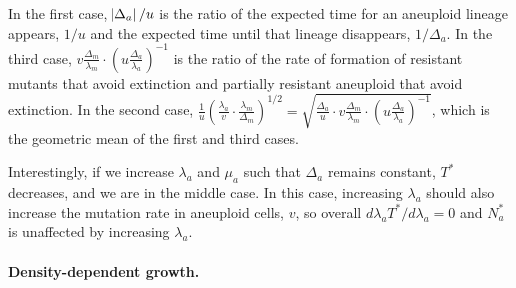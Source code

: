 \documentclass[12pt]{extarticle}
\newcommand{\presc}{p_\text{rescue}}
\begin{document}
In the first case, $\abs{\Delta_a}/u$ is  the ratio of the expected time for an aneuploid lineage appears, $1/u$ and the expected time until that lineage disappears, $1/\Delta_a$.
In the third case, $v \frac{\Delta_m}{\lambda_m} \cdot \left(u \frac{\Delta_a}{\lambda_a}\right)^{-1}$ is the ratio of the rate of formation of resistant mutants that avoid extinction and partially resistant aneuploid that avoid extinction.
In the second case, $\frac{1}{u}\left(\frac{\lambda_a}{v} \cdot \frac{\lambda_m}{\Delta_m}\right)^{1/2}=\sqrt{\frac{\Delta_a}{u} \cdot v \frac{\Delta_m}{\lambda_m} \cdot \left(u\frac{\Delta_a}{\lambda_a}\right)^{-1}}$, which is the geometric mean of the first and third cases.

Interestingly, if we increase $\lambda_a$ and $\mu_a$ such that $\Delta_a$ remains constant, $T^*$ decreases, and we are in the middle case. In this case, increasing $\lambda_a$ should also increase the mutation rate in aneuploid cells, $v$, so overall $d \lambda_a T^*/d\lambda_a = 0$ and $N_a^*$ is unaffected by increasing $\lambda_a$. 



\paragraph*{Density-dependent growth.}
\end{document}
